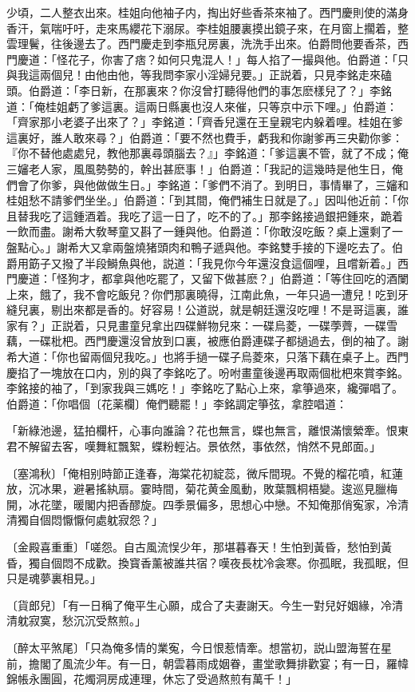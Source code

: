 少頃，二人整衣出來。桂姐向他袖子内，掏出好些香茶來袖了。西門慶則使的滿身香汗，氣喘吁吁，走來馬纓花下溺尿。李桂姐腰裏摸出鏡子來，在月窗上擱着，整雲理鬢，往後邊去了。西門慶走到李瓶兒房裏，洗洗手出來。伯爵問他要香茶，西門慶道：「怪花子，你害了痞？如何只鬼混人！」每人掐了一撮與他。伯爵道：「只與我這兩個兒！由他由他，等我問李家小淫婦兒要。」正説着，只見李銘走來磕頭。伯爵道：「李日新，在那裏來？你沒曾打聽得他們的事怎麽樣兒了？」李銘道：「俺桂姐虧了爹這裏。這兩日縣裏也沒人來催，只等京中示下哩。」伯爵道：「齊家那小老婆子出來了？」李銘道：「齊香兒還在王皇親宅内躲着哩。桂姐在爹這裏好，誰人敢來尋？」伯爵道：「要不然也費手，虧我和你謝爹再三央勸你爹：『你不替他處處兒，教他那裏尋頭腦去？』」李銘道：「爹這裏不管，就了不成；俺三嬸老人家，風風勢勢的，幹出甚麽事！」伯爵道：「我記的這幾時是他生日，俺們會了你爹，與他做做生日。」李銘道：「爹們不消了。到明日，事情畢了，三嬸和桂姐愁不請爹們坐坐。」伯爵道：「到其間，俺們補生日就是了。」因叫他近前：「你且替我吃了這鍾酒着。我吃了這一日了，吃不的了。」那李銘接過銀把鍾來，跪着一飲而盡。謝希大敎琴童又斟了一鍾與他。伯爵道：「你敢沒吃飯？桌上還剩了一盤點心。」謝希大又拿兩盤燒猪頭肉和鴨子遞與他。李銘雙手接的下邊吃去了。伯爵用筯子又撥了半段鰣魚與他，説道：「我見你今年還沒食這個哩，且嚐新着。」西門慶道：「怪狗才，都拿與他吃罷了，又留下做甚麽？」伯爵道：「等住回吃的酒闌上來，餓了，我不會吃飯兒？你們那裏曉得，江南此魚，一年只過一遭兒！吃到牙縫兒裏，剔出來都是香的。好容易！公道説，就是朝廷還沒吃哩！不是哥這裏，誰家有？」正説着，只見畫童兒拿出四碟鮮物兒來：一碟烏菱，一碟荸薺，一碟雪藕，一碟枇杷。西門慶還沒曾放到口裏，被應伯爵連碟子都撾過去，倒的袖了。謝希大道：「你也留兩個兒我吃。」也將手撾一碟子烏菱來，只落下藕在桌子上。西門慶掐了一塊放在口内，別的與了李銘吃了。吩咐畫童後邊再取兩個枇杷來賞李銘。李銘接的袖了，「到家我與三媽吃！」李銘吃了點心上來，拿箏過來，纔彈唱了。伯爵道：「你唱個〔花薬欄〕俺們聽罷！」李銘調定箏弦，拿腔唱道：

\begin{myquote}
「新綠池邊，猛拍欄杆，心事向誰論？花也無言，蝶也無言，離恨滿懷縈牽。恨東君不解留去客，嘆舞紅飄絮，蝶粉輕沾。景依然，事依然，悄然不見郎面。」

{\markfont〔塞鴻秋〕}「俺相别時節正逢春，海棠花初綻蕊，微斥間現。不覺的榴花噴，紅蓮放，沉冰果，避暑搖紈扇。霎時間，菊花黄金風動，敗葉飄桐梧變。逡巡見臘梅開，冰花墜，暖閣内把香醪旋。四季景偏多，思想心中戀。不知俺那俏寃家，冷清清獨自個悶懨懨何處躭寂怨？」

{\markfont〔金殿喜重重〕}「嗟怨。自古風流悮少年，那堪暮春天！生怕到黃昏，愁怕到黃昏，獨自個悶不成歡。換寳香薰被誰共宿？嘆夜長枕冷衾寒。你孤眠，我孤眠，但只是魂夢裏相見。」

{\markfont〔貨郎兒〕}「有一日稱了俺平生心願，成合了夫妻謝天。今生一對兒好姻緣，冷清清躭寂寞，愁沉沉受熬煎。」

{\markfont〔醉太平煞尾〕}「只為俺多情的業寃，今日恨惹情牽。想當初，説山盟海誓在星前，擔閣了風流少年。有一日，朝雲暮雨成姻眷，畫堂歌舞排歡宴；有一日，羅幃錦帳永團圓，花燭洞房成連理，休忘了受過熬煎有萬千！」
\end{myquote}

